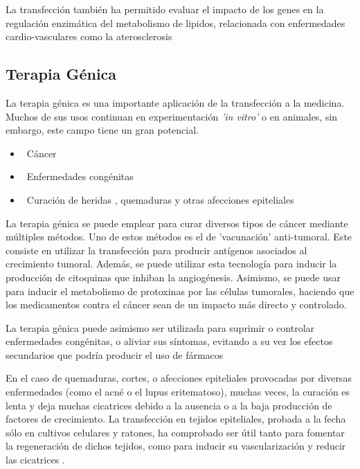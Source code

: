 \documentclass[fleqn,10pt]{SelfArx} %
\begin{document}
La transfección también ha permitido evaluar el impacto de los genes en la regulación enzimática del metabolismo de lipidos, relacionada con enfermedades cardio-vasculares como la aterosclerosis\cite{yanni2004laboratory}


\subsection{Terapia Génica}

La terapia génica es una importante aplicación de la transfección a la medicina. Muchos de sus usos continuan en experimentación \textit{'in vitro'} o en animales, sin embargo, este campo tiene un gran potencial.
\begin{itemize}[noitemsep] %
\item \ Cáncer
\item \ Enfermedades congénitas
\item \ Curación de heridas , quemaduras y otras afecciones epiteliales
\end{itemize}

La terapia génica se puede emplear para curar diversos tipos de cáncer mediante múltiples métodos. Uno de estos métodos es el de 'vacunación' anti-tumoral. Este consiste en utilizar la transfección para producir antígenos asociados al crecimiento tumoral. Además, se puede utilizar esta tecnología para inducir la producción de citoquinas que inhiban la angiogénesis. Asimismo, se puede usar para inducir el metabolismo de protoxinas por las células tumorales, haciendo que los medicamentos contra el cáncer sean de un impacto más directo y controlado\cite{Vile, Seung}.

La terapia génica puede asimismo ser utilizada para suprimir o controlar enfermedades congénitas, o aliviar sus síntomas, evitando a su vez los efectos secundarios que podría producir el uso de fármacos \cite{Spink}

En el caso de quemaduras, cortes, o afecciones epiteliales provocadas por diversas enfermedades (como el acné o el lupus eritematoso), muchas veces, la curación es lenta y deja muchas cicatrices debido a la ausencia o a la baja producción de factores de crecimiento. La transfección en tejidos epiteliales, probada a la fecha sólo en cultivos celulares y ratones, ha comprobado ser útil tanto para fomentar la regeneración de dichos tejidos, como para inducir su vascularización y reducir las cicatrices \cite{branskigene2006, Reinhart, strulovicihuman2007}.
\end{document}

